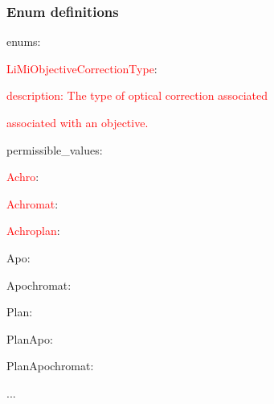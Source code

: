 \begin{frame}
  \frametitle{Enum definitions}

\begin{semiverbatim}
enums:

\hspace{1em}\textcolor<2>{red}{LiMiObjectiveCorrectionType}:

\hspace{2em}\textcolor<3>{red}{description: The type of optical correction associated}

\hspace{3em}\textcolor<3>{red}{associated with an objective.}

\hspace{2em}permissible\_values:

\hspace{3em}\textcolor<4>{red}{Achro}:

\hspace{3em}\textcolor<4>{red}{Achromat}:

\hspace{3em}\textcolor<4>{red}{Achroplan}:

\hspace{3em}Apo:

\hspace{3em}Apochromat:

\hspace{3em}Plan:

\hspace{3em}PlanApo:

\hspace{3em}PlanApochromat:

\hspace{3em}...
\end{semiverbatim}
\end{frame}


